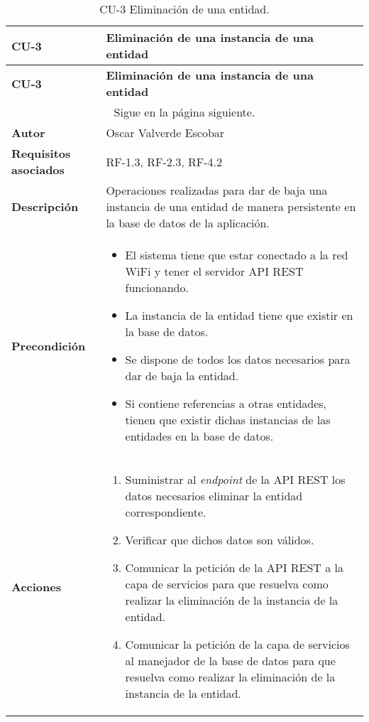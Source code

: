 \begin{longtable}{ p{} p{} }
    \caption{CU-3 Eliminación de una entidad.}\\
    \hline
    \textbf{CU-3}    & \textbf{Eliminación de una instancia de una entidad}\\
    \hline
    \endfirsthead
    \hline
    \textbf{CU-3}    & \textbf{Eliminación de una instancia de una entidad}\\
    \hline
    \endhead
    \hline
    \multicolumn{2}{c}{Sigue en la página siguiente.}
    \endfoot
    \hline
    \endlastfoot
    
    \textbf{Versión}              & 1.0    \\
    \textbf{Autor}                & Oscar Valverde Escobar \\
    \textbf{Requisitos asociados} & RF-1.3, RF-2.3, RF-4.2\\
    \textbf{Descripción}          & Operaciones realizadas para dar de baja una instancia de una entidad de manera persistente en la base de datos de la aplicación.\\
    \textbf{Precondición}         & 
        \begin{itemize}
            \item El sistema tiene que estar conectado a la red WiFi y tener el servidor API REST funcionando. 
            \item La instancia de la entidad tiene que existir en la base de datos. 
            \item Se dispone de todos los datos necesarios para dar de baja la entidad.
            \item Si contiene referencias a otras entidades, tienen que existir dichas instancias de las entidades en la base de datos.
        \end{itemize}\\
    \textbf{Acciones}             &
    \begin{enumerate}
        \def\labelenumi{\arabic{enumi}.}
        \tightlist
        \item Suministrar al \textit{endpoint} de la API REST los datos necesarios eliminar la entidad correspondiente.
        \item Verificar que dichos datos son válidos.
        \item Comunicar la petición de la API REST a la capa de servicios para que resuelva como realizar la eliminación de la instancia de la  entidad.
        \item Comunicar la petición de la capa de servicios al manejador de la base de datos para que resuelva como realizar la eliminación de la instancia de la  entidad.

\end{enumerate}
\end{longtable}
